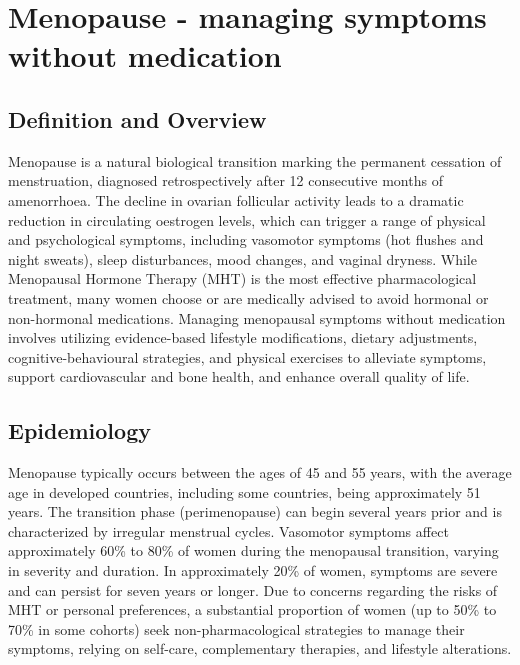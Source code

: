 \chapter{Menopause - managing symptoms without medication}

\section*{Definition and Overview}
Menopause is a natural biological transition marking the permanent cessation of menstruation, diagnosed retrospectively after 12 consecutive months of amenorrhoea. The decline in ovarian follicular activity leads to a dramatic reduction in circulating oestrogen levels, which can trigger a range of physical and psychological symptoms, including vasomotor symptoms (hot flushes and night sweats), sleep disturbances, mood changes, and vaginal dryness. While Menopausal Hormone Therapy (MHT) is the most effective pharmacological treatment, many women choose or are medically advised to avoid hormonal or non-hormonal medications. Managing menopausal symptoms without medication involves utilizing evidence-based lifestyle modifications, dietary adjustments, cognitive-behavioural strategies, and physical exercises to alleviate symptoms, support cardiovascular and bone health, and enhance overall quality of life.

\section*{Epidemiology}
Menopause typically occurs between the ages of 45 and 55 years, with the average age in developed countries, including some countries, being approximately 51 years. The transition phase (perimenopause) can begin several years prior and is characterized by irregular menstrual cycles. Vasomotor symptoms affect approximately 60\% to 80\% of women during the menopausal transition, varying in severity and duration. In approximately 20\% of women, symptoms are severe and can persist for seven years or longer. Due to concerns regarding the risks of MHT or personal preferences, a substantial proportion of women (up to 50\% to 70\% in some cohorts) seek non-pharmacological strategies to manage their symptoms, relying on self-care, complementary therapies, and lifestyle alterations.

